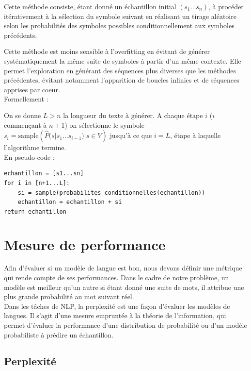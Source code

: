 Cette méthode consiste, étant donné un échantillon initial $(s_1\ldots s_n)$, à procéder itérativement à la sélection du symbole suivant en réalisant un tirage aléatoire selon les probabilités des symboles possibles conditionnellement aux symboles précédents.

Cette méthode est moins sensible à l'overfitting en évitant de générer systématiquement la même suite de symboles à partir d'un même contexte. Elle permet l'exploration en générant des séquences plus diverses que les méthodes précédentes, évitant notamment l'apparition de boucles infinies et de séquences apprises par coeur. \\

Formellement :

On se donne $L>n$ la longueur du texte à générer.
A chaque étape $i$ ($i$ commençant à $n+1$) on sélectionne le symbole $s_i = \text{sample}({\widehat{P}(s|s_1\ldots s_{i-1}) | s \in V})$ jusqu'à ce que $i=L$, étape à laquelle l'algorithme termine. \\

En pseudo-code :

\begin{verbatim}
echantillon = [s1...sn]
for i in [n+1...L]:
    si = sample(probabilites_conditionnelles(echantillon))
    echantillon = echantillon + si
return echantillon
\end{verbatim}

\section{Mesure de performance}

Afin d’évaluer si un modèle de langue est bon, nous devons définir une métrique qui rende 
compte de ses performances.
Dans le cadre de notre problème, un modèle est meilleur qu’un autre si étant donné une 
suite de mots, il attribue une plus grande probabilité au mot suivant réel.  \\

Dans les tâches de NLP, la \og perplexité \fg{} est une façon d’évaluer les modèles de langues.
Il s'agit d'une mesure empruntée à la théorie de l'information, qui permet d'évaluer la 
performance d'une distribution de probabilité ou d'un modèle probabiliste à prédire un échantillon.

\subsection{Perplexité}


